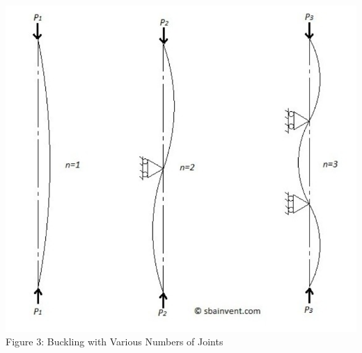 \documentclass{article}
\begin{document}
    \begin{center}
        \includegraphics[scale=0.6, frame]{buckling2.png}
        \\Figure 3: Buckling with Various Numbers of Joints
    \end{center}
\end{document}
